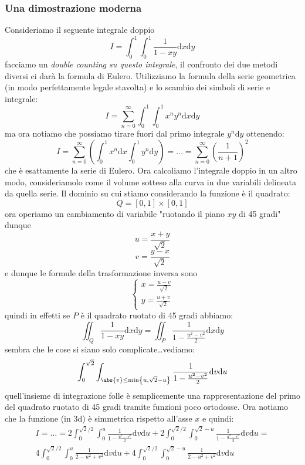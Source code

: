 \documentclass[11pt]{scrartcl}
\begin{document}
  \subsubsection{Una dimostrazione moderna}
  Consideriamo il seguente integrale doppio
  $$I=\int_0^1\int_0^1\frac{1}{1-xy}\text{d}x\text{d}y$$
  facciamo un \textit{double counting su questo integrale}, il confronto dei due metodi diversi ci darà la formula di Eulero. Utilizziamo la formula della serie geometrica (in modo perfettamente legale stavolta) e lo scambio dei simboli di serie e integrale:
  $$I=\sum_{n=0}^{\infty}\int_0^1\int_0^1 x^ny^n\text{d}x\text{d}y$$
  ma ora notiamo che possiamo tirare fuori dal primo integrale $y^n\text{d}y$ ottenendo:
  $$I=\sum_{n=0}^{\infty}\left(\int_0^1x^n\text{d}x\int_0^1y^n\text{d}y\right)=\dots=\sum_{n=0}^{\infty}\left(\frac{1}{n+1}\right)^2$$
  che è esattamente la serie di Eulero. Ora calcoliamo l'integrale doppio in un altro modo, consideriamolo come il volume sotteso alla curva in due variabili delineata da quella serie. Il dominio su cui stiamo considerando la funzione è il quadrato:
  $$Q=[0,1]\times[0,1]$$
  ora operiamo un cambiamento di variabile "ruotando il piano $xy$ di 45 gradi" dunque 
  $$u=\frac{x+y}{\sqrt{2}}$$
  $$v=\frac{y-x}{\sqrt{2}}$$
  e dunque le formule della trasformazione inversa sono
  $$\begin{cases}
  	x=\frac{u-v}{\sqrt{2}} \\
  	y=\frac{u+v}{\sqrt{2}}
  \end{cases}$$
  quindi in effetti se $P$ è il quadrato ruotato di 45 gradi abbiamo:
  $$\iint_Q\frac{1}{1-xy}\text{d}x\text{d}y=\iint_P \frac{1}{1-\frac{u^2-v^2}{2}}\text{d}x\text{d}y$$
  sembra che le cose si siano solo complicate\dots vediamo:
  $$\int_{0}^{\sqrt{2}}\int_{\abs{v}\le\min\left\{u,\sqrt{2}-u\right\}}\frac{1}{1-\frac{u^2-v^2}{2}}\text{d}v\text{d}u$$
  quell'insieme di integrazione folle è semplicemente una rappresentazione del primo del quadrato ruotato di 45 gradi tramite funzioni poco ortodosse. Ora notiamo che la funzione (in 3d) è simmetrica rispetto all'asse $x$ e quindi:
  \begin{align*}
  	I=\dots = 2\int_0^{\sqrt{2}/2}\int_0^u\frac{1}{1-\frac{u^2-v^2}{2}}\text{d}v\text{d}u+ 2\int_0^{\sqrt{2}/2}\int_0^{\sqrt{2}-u}\frac{1}{1-\frac{u^2-v^2}{2}}\text{d}v\text{d}u= \\ 4\int_0^{\sqrt{2}/2}\int_0^u\frac{1}{2-u^2+v^2}\text{d}v\text{d}u+4\int_0^{\sqrt{2}/2}\int_0^{\sqrt{2}-u}\frac{1}{2-u^2+v^2}\text{d}v\text{d}u
  \end{align*}
\end{document}
